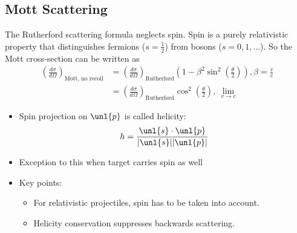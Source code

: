 \documentclass[a4paper, 11pt, normalem]{report}
\begin{document}
\section{Mott Scattering}
The Rutherford scattering formula neglects spin.
Spin is a purely relativistic property that distinguishes fermions ($s=\frac{1}{2}$) from bosons ($s=0,1,\dots$).
So the Mott cross-section can be written as
\begin{align}
    \left(\frac{d\sigma}{d\Omega}\right)_{\text{Mott, no recoil}} &= \left(\frac{d\sigma}{d\Omega}\right)_{\text{Rutherford}} \left(1 - \beta^2\sin^2\left(\frac{\theta}{2}\right)\right), \beta = \frac{v}{c} \\
                                                                  &= \left(\frac{d\sigma}{d\Omega}\right)_{\text{Rutherford}} \cos^2\left(\frac\theta 2\right),~ \lim_{v\to c} 
\end{align}
\begin{itemize}
    \item Spin projection on $\unl{p}$ is called helicity:
        \begin{equation}
            h = \frac{\unl{s}\cdot\unl{p}}{|\unl{s}||\unl{p}|}
        \end{equation}
    \item Exception to this when target carries spin as well
    \item Key points:
        \begin{itemize}
            \item For relativistic projectiles, spin has to be taken into account.
            \item Helicity conservation suppresses backwards scattering.
        \end{itemize}
\end{itemize}

\chapter{}
\end{document}
